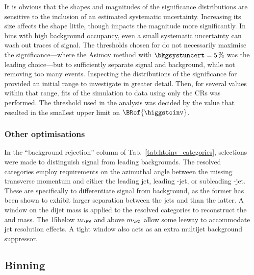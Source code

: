 It is obvious that the shapes and magnitudes of the significance distributions are sensitive to the inclusion of an estimated systematic uncertainty. Increasing its size affects the shape little, though impacts the magnitude more significantly. In bins with high background occupancy, even a small systematic uncertainty can wash out traces of signal. The thresholds chosen for \omegaTilde do not necessarily maximise the significance---where the Asimov method with $\bkgsystuncert = \text{5\,\%}$ was the leading choice---but to sufficiently separate signal and background, while not removing too many events. Inspecting the distributions of the significance for \omegaTilde provided an initial range to investigate in greater detail. Then, for several values within that range, fits of the simulation to data using only the \glspl{CR} was performed. The threshold used in the analysis was decided by the value that resulted in the smallest upper limit on $\BRof{\higgstoinv}$.




\subsubsection{Other optimisations}
\label{subsubsec:htoinv_other_optimisations}

In the ``background rejection'' column of Tab.~\ref{tab:htoinv_categories}, selections were made to distinguish signal from leading backgrounds. The \ttH resolved categories employ requirements on the azimuthal angle between the missing transverse momentum and either the leading jet, leading \Pbottom-jet, or subleading \Pbottom-jet. These are specifically to differentiate \ttH signal from \ttbar background, as the former has been shown to exhibit larger separation between the \glspl{jet} and \ptvecmiss than the latter. A window on the dijet mass is applied to the \VH resolved categories to reconstruct the \PW and \PZ mass. The 15\GeV below $m_{\PW}$ and above $m_{\PZ}$ allow some leeway to accommodate \gls{jet} resolution effects. A tight window also acts as an extra multijet background suppressor.




\subsection{Binning}
\label{subsec:htoinv_binning}

